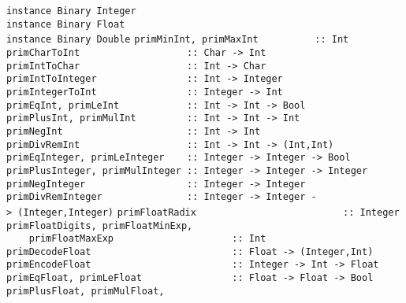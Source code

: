 \mbox{\tt instance\ Binary\ Integer}\\
\mbox{\tt instance\ Binary\ Float}\\
\mbox{\tt instance\ Binary\ Double}
\eprogB\noindent\bprogB
\mbox{\tt primMinInt,\ primMaxInt\ \ \ \ \ \ \ \ \ \ ::\ Int}\\
\mbox{\tt primCharToInt\ \ \ \ \ \ \ \ \ \ \ \ \ \ \ \ \ \ \ ::\ Char\ ->\ Int}\\
\mbox{\tt primIntToChar\ \ \ \ \ \ \ \ \ \ \ \ \ \ \ \ \ \ \ ::\ Int\ ->\ Char}\\
\mbox{\tt primIntToInteger\ \ \ \ \ \ \ \ \ \ \ \ \ \ \ \ ::\ Int\ ->\ Integer}\\
\mbox{\tt primIntegerToInt\ \ \ \ \ \ \ \ \ \ \ \ \ \ \ \ ::\ Integer\ ->\ Int}
\eprogB\noindent\bprogB
\mbox{\tt primEqInt,\ primLeInt\ \ \ \ \ \ \ \ \ \ \ \ ::\ Int\ ->\ Int\ ->\ Bool}\\
\mbox{\tt primPlusInt,\ primMulInt\ \ \ \ \ \ \ \ \ ::\ Int\ ->\ Int\ ->\ Int}\\
\mbox{\tt primNegInt\ \ \ \ \ \ \ \ \ \ \ \ \ \ \ \ \ \ \ \ \ \ ::\ Int\ ->\ Int}\\
\mbox{\tt primDivRemInt\ \ \ \ \ \ \ \ \ \ \ \ \ \ \ \ \ \ \ ::\ Int\ ->\ Int\ ->\ (Int,Int)}
\eprogB\noindent\bprogB
\mbox{\tt primEqInteger,\ primLeInteger\ \ \ \ ::\ Integer\ ->\ Integer\ ->\ Bool}\\
\mbox{\tt primPlusInteger,\ primMulInteger\ ::\ Integer\ ->\ Integer\ ->\ Integer}\\
\mbox{\tt primNegInteger\ \ \ \ \ \ \ \ \ \ \ \ \ \ \ \ \ \ ::\ Integer\ ->\ Integer}\\
\mbox{\tt primDivRemInteger\ \ \ \ \ \ \ \ \ \ \ \ \ \ \ ::\ Integer\ ->\ Integer\ ->\ (Integer,Integer)}
\eprogB\noindent\bprogB
\mbox{\tt primFloatRadix\ \ \ \ \ \ \ \ \ \ \ \ \ \ \ \ \ \ \ \ \ \ \ \ \ \ ::\ Integer}\\
\mbox{\tt primFloatDigits,\ primFloatMinExp,}\\
\mbox{\tt \ \ \ \ primFloatMaxExp\ \ \ \ \ \ \ \ \ \ \ \ \ \ \ \ \ \ \ \ \ ::\ Int}\\
\mbox{\tt primDecodeFloat\ \ \ \ \ \ \ \ \ \ \ \ \ \ \ \ \ \ \ \ \ \ \ \ \ ::\ Float\ ->\ (Integer,Int)}\\
\mbox{\tt primEncodeFloat\ \ \ \ \ \ \ \ \ \ \ \ \ \ \ \ \ \ \ \ \ \ \ \ \ ::\ Integer\ ->\ Int\ ->\ Float}\\
\mbox{\tt primEqFloat,\ primLeFloat\ \ \ \ \ \ \ \ \ \ \ \ \ \ \ \ ::\ Float\ ->\ Float\ ->\ Bool}\\
\mbox{\tt primPlusFloat,\ primMulFloat,}\\
